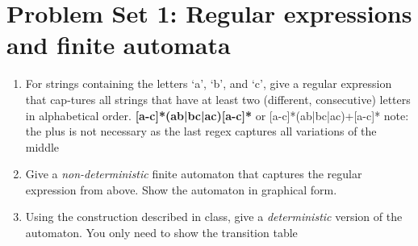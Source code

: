 \documentclass{article}
\begin{document}
\section*{Problem Set 1: Regular expressions and finite automata}
\begin{enumerate}
  \setlength\itemsep{-.25em}
  \item For strings containing the letters ‘a’, ‘b’, and ‘c’, give a regular expression that cap-tures all strings that have at least two (different, consecutive) letters in alphabetical order.
    \newline\newline
    \textbf{[a-c]*(ab|bc|ac)[a-c]*}  or  [a-c]*(ab|bc|ac)+[a-c]*
    \newline
    note: the plus is not necessary as the last regex captures all variations of the middle
    \newline
  \item Give a \textit{non-deterministic} finite automaton that captures the regular expression from
above. Show the automaton in graphical form.
  \newline
  \newline
  \item Using the construction described in class, give a \textit{deterministic} version of the automaton. You only need to show the transition table


\end{enumerate}
\end{document}
